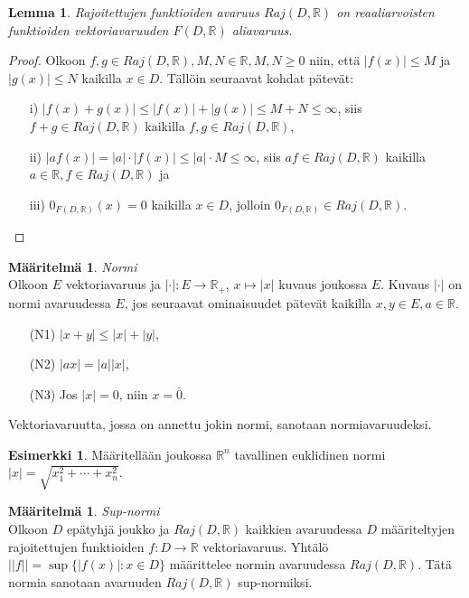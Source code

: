 \documentclass[12pt,a4paper,leqno]{report}
\newcommand{\R}{\mathbb{R}}
\theoremstyle{plain}
\newtheorem{lem}[equation]{Lemma}
\theoremstyle{definition}
\newtheorem{maar}[equation]{Määritelmä}
\newtheorem{esim}[equation]{Esimerkki}
\theoremstyle{remark}
\begin{document}
\begin{lem}
Rajoitettujen funktioiden avaruus $Raj(D,\R )$ on reaaliarvoisten funktioiden vektoriavaruuden $F(D,\R)$ aliavaruus.
\end{lem}
\begin{proof}
 Olkoon $f,g\in Raj(D,\R),M,N\in\R, M,N\geq 0$ niin, että $|f(x)|\leq M$ ja $|g(x)|\leq N$ kaikilla $x\in D$. Tällöin seuraavat kohdat pätevät: 
\begin{itemize}
\item[i)\phantom{iiv}] $|f(x)+g(x)|\leq|f(x)|+|g(x)|\leq M+N\leq\infty$, siis $f+g\in Raj(D,\R)$ kaikilla $f,g\in Raj(D,\R),$
\item[ii)\phantom{iv}] $|af(x)|= |a|\cdot|f(x)|\leq |a|\cdot M\leq\infty$, siis $af\in Raj(D,\R)$ kaikilla $a\in\R, f\in Raj(D,\R)$ ja
\item[iii)\phantom{v}] $0_{F(D,\R)}(x)=0$ kaikilla $x\in D$, jolloin $0_{F(D,\R)} \in Raj(D,\R )$.
\end{itemize}
\end{proof}

\begin{maar} \emph{Normi}\\
Olkoon $E$ vektoriavaruus ja $|\cdot|\colon E\rightarrow \R_+$, $x\mapsto|x|$ kuvaus joukossa $E$. %
Kuvaus $|\cdot|$ on normi avaruudessa $E$, jos seuraavat ominaisuudet pätevät kaikilla $ x,y\in E, a\in\R$.
\begin{itemize}
\item[(N1)]$|x+y|\leq |x|+|y|$,
\item[(N2)]$|ax|=|a||x|$,
\item[(N3)]Jos $|x|=0$, niin $x=\bar{0}$.
\end{itemize} 
Vektoriavaruutta, jossa on annettu jokin normi, sanotaan normiavaruudeksi.

\end{maar} 

\begin{esim}
Määritellään joukossa $\R ^n$ tavallinen euklidinen normi $|x| = \sqrt{x^{2}_{1} + \cdots +x^{2}_{n}}$.

\end{esim}

\begin{maar} \emph{Sup-normi}\\
Olkoon $D$ epätyhjä joukko ja $Raj(D,\R )$ kaikkien avaruudessa $D$ määriteltyjen rajoitettujen funktioiden $f\colon D\rightarrow \R$ vektoriavaruus. Yhtälö $||f||=\sup\{|f(x)|\colon x\in D\}$ määrittelee normin avaruudessa $Raj(D,\R )$. %
Tätä normia sanotaan avaruuden $Raj(D,\R )$ sup-normiksi.

\end{maar} 
\end{document}
